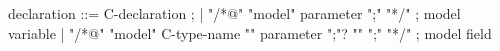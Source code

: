 \begin{syntax}
  declaration ::= C-declaration ;
  | {"/*@" "model" parameter ";" "*/"} ; \hspace{-7mm} model variable
  | { "/*@" "model" C-type-name "{" parameter ";"? "}" ";" "*/" } ; model field
\end{syntax}
